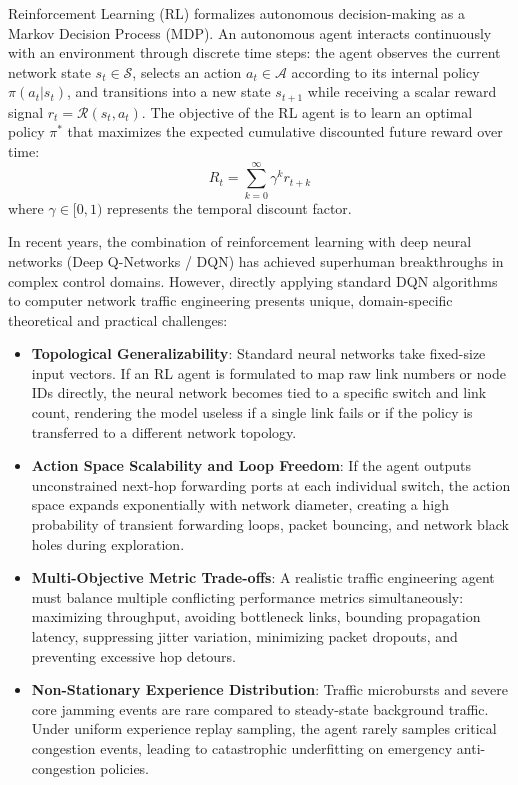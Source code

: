 Reinforcement Learning (RL) formalizes autonomous decision-making as a Markov Decision Process (MDP). An autonomous agent interacts continuously with an environment through discrete time steps: the agent observes the current network state $s_t \in \mathcal{S}$, selects an action $a_t \in \mathcal{A}$ according to its internal policy $\pi(a_t|s_t)$, and transitions into a new state $s_{t+1}$ while receiving a scalar reward signal $r_t = \mathcal{R}(s_t, a_t)$. The objective of the RL agent is to learn an optimal policy $\pi^*$ that maximizes the expected cumulative discounted future reward over time:
\begin{equation}
    R_t = \sum_{k=0}^{\infty} \gamma^k r_{t+k}
\end{equation}
where $\gamma \in [0, 1)$ represents the temporal discount factor.

In recent years, the combination of reinforcement learning with deep neural networks (Deep Q-Networks / DQN) has achieved superhuman breakthroughs in complex control domains. However, directly applying standard DQN algorithms to computer network traffic engineering presents unique, domain-specific theoretical and practical challenges:
\begin{itemize}
    \item \textbf{Topological Generalizability}: Standard neural networks take fixed-size input vectors. If an RL agent is formulated to map raw link numbers or node IDs directly, the neural network becomes tied to a specific switch and link count, rendering the model useless if a single link fails or if the policy is transferred to a different network topology.
    \item \textbf{Action Space Scalability and Loop Freedom}: If the agent outputs unconstrained next-hop forwarding ports at each individual switch, the action space expands exponentially with network diameter, creating a high probability of transient forwarding loops, packet bouncing, and network black holes during exploration.
    \item \textbf{Multi-Objective Metric Trade-offs}: A realistic traffic engineering agent must balance multiple conflicting performance metrics simultaneously: maximizing throughput, avoiding bottleneck links, bounding propagation latency, suppressing jitter variation, minimizing packet dropouts, and preventing excessive hop detours.
    \item \textbf{Non-Stationary Experience Distribution}: Traffic microbursts and severe core jamming events are rare compared to steady-state background traffic. Under uniform experience replay sampling, the agent rarely samples critical congestion events, leading to catastrophic underfitting on emergency anti-congestion policies.
\end{itemize}

